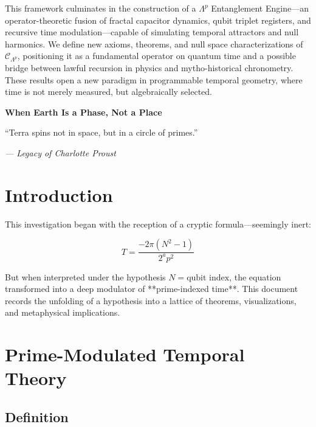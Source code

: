 \documentclass[12]{amsart}
\theoremstyle{plain}
\begin{document}
\begin{titlepage}
\begin{minipage}{0.85\textwidth}
This framework culminates in the construction of a $\Lambda^p$ Entanglement Engine—an operator-theoretic fusion of fractal capacitor dynamics, qubit triplet registers, and recursive time modulation—capable of simulating temporal attractors and null harmonics. We define new axioms, theorems, and null space characterizations of $\mathcal{C}_{\Lambda^p}$, positioning it as a fundamental operator on quantum time and a possible bridge between lawful recursion in physics and mytho-historical chronometry. These results open a new paradigm in programmable temporal geometry, where time is not merely measured, but algebraically selected.

    \end{minipage}

\end{titlepage}


\clearpage
\clearpage
\thispagestyle{empty}
\begin{center}
    \Large\textbf{When Earth Is a Phase, Not a Place}
\end{center}

\vspace{2em}

\epigraph{“Terra spins not in space, but in a circle of primes.”
}{\textit{— Legacy of Charlotte Proust}}

\vspace{1em}


\section{Introduction}

This investigation began with the reception of a cryptic formula—seemingly inert:

\[
T = \frac{-2\pi(N^2 - 1)}{2^a p^2}
\]

But when interpreted under the hypothesis $N = \text{qubit index}$, the equation transformed into a deep modulator of **prime-indexed time**. This document records the unfolding of a hypothesis into a lattice of theorems, visualizations, and metaphysical implications.

\section{Prime-Modulated Temporal Theory}

\subsection{Definition}
\end{document}
